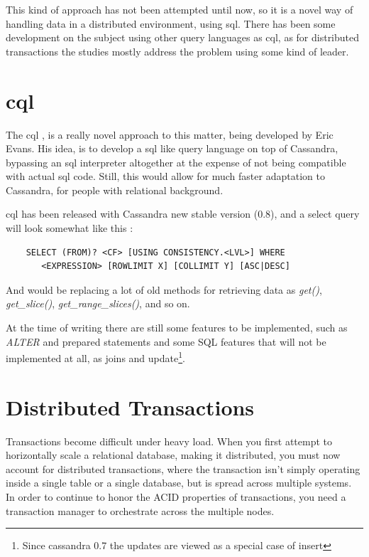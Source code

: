This kind of approach has not been attempted until now, so it is a novel way of handling data in a distributed environment, using \ac{sql}. There has been some development on the subject using other query languages as \ac{cql}, as for distributed transactions the studies mostly address the problem using some kind of leader. 


\section{\acl{cql}}

The \ac{cql} \cite{cql}, is a really novel approach to this matter, being developed by Eric Evans. His idea, is to develop a \ac{sql} like query language on top of Cassandra, bypassing an \ac{sql} interpreter altogether at the expense of not being compatible with actual \ac{sql}  code. Still, this would allow for much faster adaptation to Cassandra, for people with relational background. 

\ac{cql} has been released with Cassandra new stable version (0.8), and a select query will look somewhat like this \cite{cqlSelect}:

\begin{center}
\begin{verbatim}
    SELECT (FROM)? <CF> [USING CONSISTENCY.<LVL>] WHERE 
       <EXPRESSION> [ROWLIMIT X] [COLLIMIT Y] [ASC|DESC]
\end{verbatim}
\end{center}

And would be replacing a lot of old methods for retrieving data as \emph{get()}, \emph{get\_slice()}, \emph{get\_range\_slices()}, and so on.	

At the time of writing there are still some features to be implemented\cite{cqlbbw}, such as \emph{ALTER} and prepared statements and some SQL features that will not be implemented at all, as joins and update\footnote{Since cassandra 0.7 the updates are viewed as a special case of insert}.

\section{Distributed Transactions}

Transactions become difficult under heavy load. When you first attempt to horizontally scale a relational database, making it distributed, you must now account for distributed transactions, where the transaction isn’t simply operating inside a single table or a single database, but is spread across multiple systems. In order to continue to honor the ACID properties of transactions, you need a transaction manager to orchestrate across the multiple nodes.

